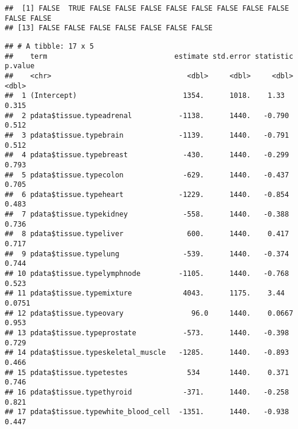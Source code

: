 \documentclass[]{article}
\newenvironment{Shaded}{\begin{snugshade}}{\end{snugshade}}
\newcommand{\KeywordTok}[1]{\textcolor[rgb]{0.13,0.29,0.53}{\textbf{#1}}}
\newcommand{\DecValTok}[1]{\textcolor[rgb]{0.00,0.00,0.81}{#1}}
\newcommand{\StringTok}[1]{\textcolor[rgb]{0.31,0.60,0.02}{#1}}
\newcommand{\OperatorTok}[1]{\textcolor[rgb]{0.81,0.36,0.00}{\textbf{#1}}}
\newcommand{\NormalTok}[1]{#1}
\begin{document}
\begin{Shaded}
\end{Shaded}

\begin{verbatim}
##  [1] FALSE  TRUE FALSE FALSE FALSE FALSE FALSE FALSE FALSE FALSE FALSE FALSE
## [13] FALSE FALSE FALSE FALSE FALSE FALSE FALSE
\end{verbatim}

\begin{Shaded}
\end{Shaded}

\begin{verbatim}
## # A tibble: 17 x 5
##    term                              estimate std.error statistic p.value
##    <chr>                                <dbl>     <dbl>     <dbl>   <dbl>
##  1 (Intercept)                         1354.      1018.    1.33    0.315 
##  2 pdata$tissue.typeadrenal           -1138.      1440.   -0.790   0.512 
##  3 pdata$tissue.typebrain             -1139.      1440.   -0.791   0.512 
##  4 pdata$tissue.typebreast             -430.      1440.   -0.299   0.793 
##  5 pdata$tissue.typecolon              -629.      1440.   -0.437   0.705 
##  6 pdata$tissue.typeheart             -1229.      1440.   -0.854   0.483 
##  7 pdata$tissue.typekidney             -558.      1440.   -0.388   0.736 
##  8 pdata$tissue.typeliver               600.      1440.    0.417   0.717 
##  9 pdata$tissue.typelung               -539.      1440.   -0.374   0.744 
## 10 pdata$tissue.typelymphnode         -1105.      1440.   -0.768   0.523 
## 11 pdata$tissue.typemixture            4043.      1175.    3.44    0.0751
## 12 pdata$tissue.typeovary                96.0     1440.    0.0667  0.953 
## 13 pdata$tissue.typeprostate           -573.      1440.   -0.398   0.729 
## 14 pdata$tissue.typeskeletal_muscle   -1285.      1440.   -0.893   0.466 
## 15 pdata$tissue.typetestes              534       1440.    0.371   0.746 
## 16 pdata$tissue.typethyroid            -371.      1440.   -0.258   0.821 
## 17 pdata$tissue.typewhite_blood_cell  -1351.      1440.   -0.938   0.447
\end{verbatim}
\end{document}
